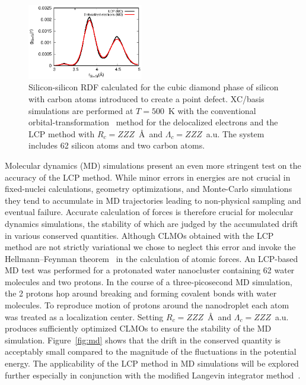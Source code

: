 \documentclass[aps,prl,twocolumn,reprint,amsmath,amssymb]{revtex4-1}
\begin{document}
\begin{figure}
\centering
\includegraphics[width=0.45\textwidth]{rdf_si}
\caption{Silicon-silicon RDF calculated for the cubic diamond phase of silicon with carbon atoms introduced to create a point defect. XC/basis simulations are performed at $T=500$~K with the conventional orbital-transformation~\cite{RZK-OT} method for the delocalized electrons and the LCP method with $R_c = ZZZ$~\AA\ and $\Lambda_c = ZZZ$~a.u. The system includes 62 silicon atoms and two carbon atoms.}
\label{fig:mc}
\end{figure}


Molecular dynamics (MD) simulations present an even more stringent test on the accuracy of the LCP method. While minor errors in energies are not crucial in fixed-nuclei calculations, geometry optimizations, and Monte-Carlo simulations they tend to accumulate in MD trajectories leading to non-physical sampling and eventual failure. Accurate calculation of forces is therefore crucial for molecular dynamics simulations, the stability of which are judged by the accumulated drift in various conserved quantities. Although CLMOs obtained with the LCP method are not strictly variational we chose to neglect this error and invoke the Hellmann--Feynman theorem~\cite{feynman1939forces} in the calculation of atomic forces. An LCP-based MD test was performed for a protonated water nanocluster containing 62 water molecules and two protons. In the course of a three-picosecond MD simulation, the 2 protons hop around breaking and forming covalent bonds with water molecules. To reproduce motion of protons around the nanodroplet each atom was treated as a localization center. Setting $R_c = ZZZ$~\AA\ and $\Lambda_c = ZZZ$~a.u. produces sufficiently optimized CLMOs to ensure the stability of the MD simulation. Figure~\ref{fig:md} shows that the drift in the conserved quantity is acceptably small compared to the magnitude of the fluctuations in the potential energy. The applicability of the LCP method in MD simulations will be explored further especially in conjunction with the modified Langevin integrator method~\cite{scheiber2018communication}. 
\end{document}
